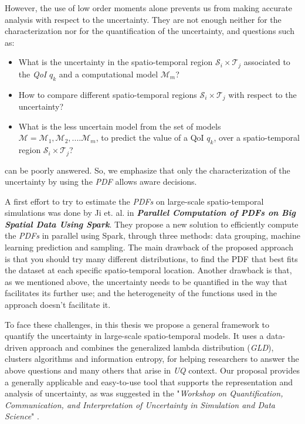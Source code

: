 However, the use of low order moments alone prevents us from making accurate analysis with respect to the uncertainty. They are not enough neither for the characterization nor for the quantification of the uncertainty, and questions such as:
\begin{itemize}
\item What is the uncertainty in the spatio-temporal region $\mathcal{S}_{i} \times \mathcal{T}_{j}$ associated to the \textit{QoI} 
$q_{k}$  and a computational model $\mathcal{M}_{m}$?
\item How to compare different spatio-temporal regions $\mathcal{S}_{i} \times \mathcal{T}_{j}$ with respect to the uncertainty? 
\item What is the less uncertain model from the set of models $\mathcal{M}={\mathcal{M}_{1},\mathcal{M}_{2},
....\mathcal{M}_{m}}$, to predict the value of a QoI $q_{k}$, over a spatio-temporal region $\mathcal{S}_{i} \times \mathcal{T}_{j}$?
\end{itemize}
can be poorly answered. So, we emphasize that only the characterization of the uncertainty by using the \textit{PDF} allows aware decisions.

A first effort to try to estimate the \textit{PDFs} on large-scale spatio-temporal simulations was done by \cite{Liu2018} {Ji et. al.} in \textbf{\textit{Parallel Computation of PDFs on Big Spatial Data Using Spark}}. They propose a new solution to efficiently compute the \textit{PDFs} in parallel using Spark, through three methods: data grouping, machine learning prediction and sampling. The main drawback of the proposed approach is that you should try many different distributions, to find the PDF that best fits the dataset at each specific spatio-temporal location. Another drawback is that, as we mentioned above, the uncertainty needs to be quantified in the way that facilitates its further use; and the heterogeneity of the functions used in the approach doesn't facilitate it. 

To face these challenges, in this thesis we propose a general framework to quantify the uncertainty in large-scale spatio-temporal models. It uses a data-driven approach and combines the generalized lambda distribution (\textit{GLD}), clusters algorithms and information entropy, for helping researchers to answer the above questions and many others that arise in \textit{UQ} context. Our proposal provides a generally applicable and easy-to-use tool that supports the representation and analysis of uncertainty, as was suggested in the "\textit{Workshop on Quantification, Communication, and Interpretation of Uncertainty in Simulation and Data Science}" \cite{Tobergte2013}. 

